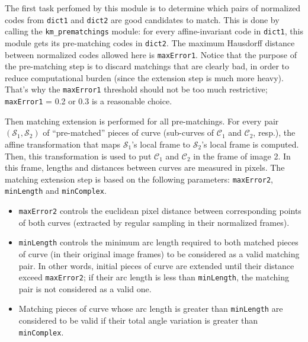 The first task perfomed by this module is to determine which pairs of
normalized codes from \verb+dict1+ and \verb+dict2+ are good
candidates to match. This is done by calling the
\verb?km_prematchings? module: for every affine-invariant 
code in \verb+dict1+, this module gets its pre-matching codes in
\verb+dict2+. The maximum Hausdorff distance between normalized codes
allowed here is \verb+maxError1+. Notice that the purpose of the
pre-matching step is to discard matchings that are clearly bad, in
order to reduce computational burden (since the extension step is much
more heavy). That's why the \verb+maxError1+ threshold should not be
too much restrictive; \verb+maxError1+ = 0.2 or 0.3 is a reasonable
choice.

Then matching extension is performed for all pre-matchings. For every
pair $({\mathcal S}_1,{\mathcal S}_2)$ of ``pre-matched'' pieces of
curve (sub-curves of ${\mathcal C}_1$ and ${\mathcal C}_2$, resp.),
the affine transformation that maps ${\mathcal S}_1$'s local frame to
${\mathcal S}_2$'s local frame is computed. Then, this transformation
is used to put ${\mathcal C}_1$ and ${\mathcal C}_2$ in the frame of
image 2. In this frame, lengths and distances between curves are
measured in pixels. The matching extension step is based on the
following parameters: \verb+maxError2+, \verb+minLength+ and
\verb+minComplex+.

\begin{itemize}
  
\item \verb+maxError2+ controls the euclidean pixel distance between
  corresponding points of both curves (extracted by regular sampling
  in their normalized frames). 
  
\item \verb+minLength+ controls the minimum arc length required to
  both matched pieces of curve (in their original image frames) to be
  considered as a valid matching pair. In other words, initial pieces of
  curve are extended until their distance exceed \verb+maxError2+; if
  their arc length is less than \verb+minLength+, the matching pair is not
  considered as a valid one.
  
\item Matching pieces of curve whose arc length is greater than
  \verb+minLength+ are considered to be valid if their total angle
  variation is greater than \verb+minComplex+.

\end{itemize}

